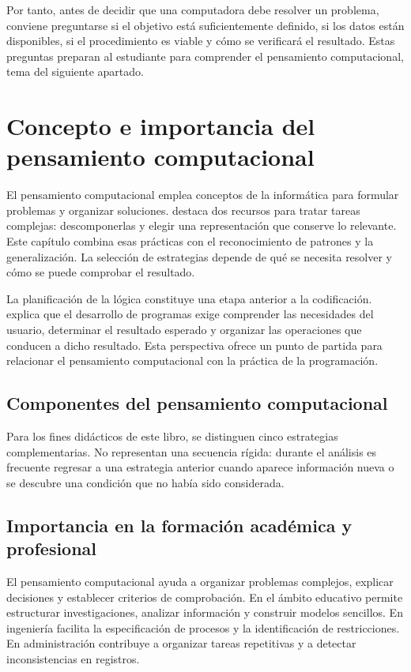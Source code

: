 Por tanto, antes de decidir que una computadora debe resolver un problema, conviene preguntarse si el objetivo está suficientemente definido, si los datos están disponibles, si el procedimiento es viable y cómo se verificará el resultado. Estas preguntas preparan al estudiante para comprender el pensamiento computacional, tema del siguiente apartado.

\section{Concepto e importancia del pensamiento computacional}

El pensamiento computacional emplea conceptos de la informática para formular problemas y organizar soluciones. \textcite{wing2006} destaca dos recursos para tratar tareas complejas: descomponerlas y elegir una representación que conserve lo relevante. Este capítulo combina esas prácticas con el reconocimiento de patrones y la generalización. La selección de estrategias depende de qué se necesita resolver y cómo se puede comprobar el resultado.

La planificación de la lógica constituye una etapa anterior a la codificación. \textcite[pp.~8–10]{farrell2013} explica que el desarrollo de programas exige comprender las necesidades del usuario, determinar el resultado esperado y organizar las operaciones que conducen a dicho resultado. Esta perspectiva ofrece un punto de partida para relacionar el pensamiento computacional con la práctica de la programación.

\subsection{Componentes del pensamiento computacional}

Para los fines didácticos de este libro, se distinguen cinco estrategias complementarias. No representan una secuencia rígida: durante el análisis es frecuente regresar a una estrategia anterior cuando aparece información nueva o se descubre una condición que no había sido considerada.



\subsection{Importancia en la formación académica y profesional}

El pensamiento computacional ayuda a organizar problemas complejos, explicar decisiones y establecer criterios de comprobación. En el ámbito educativo permite estructurar investigaciones, analizar información y construir modelos sencillos. En ingeniería facilita la especificación de procesos y la identificación de restricciones. En administración contribuye a organizar tareas repetitivas y a detectar inconsistencias en registros.

